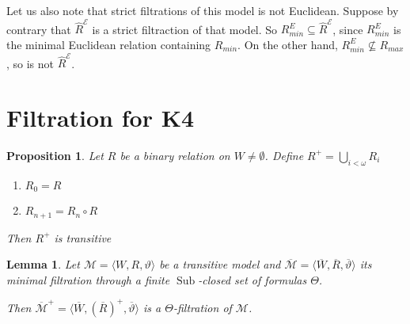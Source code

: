 \documentclass[a4paper]{article}
\theoremstyle{defin}
\theoremstyle{theorem}
\theoremstyle{prop}
\newtheorem{prop}{Proposition}
\theoremstyle{lemma}
\newtheorem{lemma}{Lemma}
\theoremstyle{fact}
\theoremstyle{ex}
\theoremstyle{col}
\begin{document}
Let us also note that strict filtrations of this model is not Euclidean.
Suppose by contrary that $\widehat{R}^{\mathcal{E}}$ is a strict filtraction of that model. So $R_{min}^E \subseteq \widehat{R}^{\mathcal{E}}$, since $R_{min}^E$ is the minimal Euclidean relation containing $R_{min}$. On the other hand, $R_{min}^E \not\subseteq R_{max}$, so is not $\widehat{R}^{\mathcal{E}}$.
\section{Filtration for {\bf K4}}

\begin{prop}
  Let $R$ be a binary relation on $W \neq \emptyset$. Define $R^{+} = \bigcup \limits_{i < \omega} R_i$
  \begin{enumerate}
    \item $R_0 = R$
    \item $R_{n + 1} = R_n \circ R$
  \end{enumerate}
  Then $R^{+}$ is transitive
\end{prop}

\begin{lemma}
  Let $\mathcal{M} = \langle W, R, \vartheta \rangle$ be a transitive model and $\overline{\mathcal{M}} = \langle \overline{W}, \overline{R}, \overline{\vartheta} \rangle$ its minimal filtration through a finite $\operatorname{Sub}$-closed set of formulas $\Theta$.

  Then $\overline{\mathcal{M}}^{+} = \langle \overline{W}, (\overline{R})^{+}, \overline{\vartheta} \rangle$ is a $\Theta$-filtration of $\mathcal{M}$.
\end{lemma}
\end{document}
